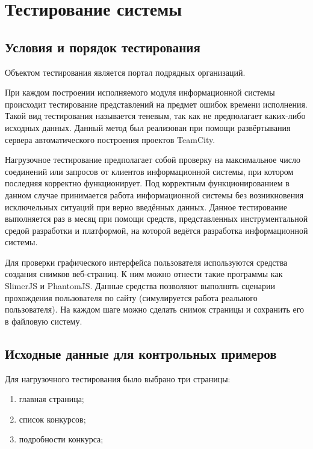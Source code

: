 \section{Тестирование системы}

\subsection{Условия и порядок тестирования}

Объектом тестирования является портал подрядных организаций.

При каждом построении исполняемого модуля информационной системы происходит тестирование представлений на предмет ошибок времени исполнения.
Такой вид тестирования называется теневым, так как не предполагает каких-либо исходных данных.
Данный метод был реализован при помощи развёртывания сервера автоматического построения проектов TeamCity.

Нагрузочное тестирование предполагает собой проверку на максимальное число соединений или запросов от клиентов информационной системы, при котором последняя корректно функционирует.
Под корректным функционированием в данном случае принимается работа информационной системы без возникновения исключельных ситуаций при верно введённых данных.
Данное тестирование выполняется раз в месяц при помощи средств, представленных инструментальной средой разработки и платформой, на которой ведётся разработка информационной системы.

Для проверки графического интерфейса пользователя используются средства создания снимков веб-страниц.
К ним можно отнести такие программы как SlimerJS и PhantomJS.
Данные средства позволяют выполнять сценарии прохождения пользователя по сайту (симулируется работа реального пользователя).
На каждом шаге можно сделать снимок страницы и сохранить его в файловую систему.

\subsection{Исходные данные для контрольных примеров}

Для нагрузочного тестирования было выбрано три страницы:

\begin{enumerate}
	\item главная страница;
	\item список конкурсов;
	\item подробности конкурса;
\end{enumerate}

